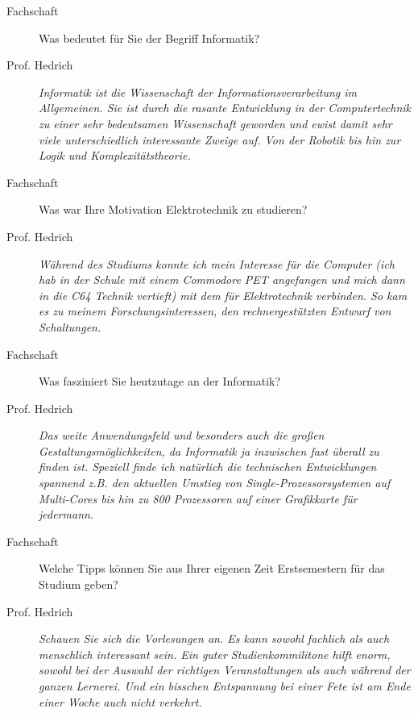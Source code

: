 \begin{description}

\item[Fachschaft] 

Was bedeutet für Sie der Begriff Informatik?

\item[Prof. Hedrich]
 
\textit{Informatik ist die Wissenschaft der Informationsverarbeitung im Allgemeinen.
Sie ist durch die rasante Entwicklung in der Computertechnik zu einer sehr
bedeutsamen Wissenschaft geworden und ewist damit sehr viele unterschiedlich
interessante Zweige auf. Von der Robotik bis hin zur Logik und Komplexitätstheorie.}



\item[Fachschaft]

Was war Ihre Motivation Elektrotechnik zu studieren?

\item[Prof. Hedrich]

\textit{Während des Studiums konnte ich mein Interesse für die Computer (ich hab
in der Schule mit einem Commodore PET angefangen und mich dann in
die C64 Technik vertieft) mit dem für Elektrotechnik verbinden.
So kam es zu meinem Forschungsinteressen, den rechnergestützten Entwurf von
Schaltungen.}

\item[Fachschaft]

Was fasziniert Sie heutzutage an der Informatik?

\item[Prof. Hedrich]

\textit{Das weite Anwendungsfeld und besonders auch die großen
Gestaltungsmöglichkeiten, da Informatik ja inzwischen fast überall
zu finden ist. Speziell finde ich natürlich die technischen Entwicklungen
spannend z.B. den aktuellen Umstieg von Single-Prozessorsystemen auf
Multi-Cores bis hin zu 800 Prozessoren auf einer Grafikkarte für
jedermann.}

\item[Fachschaft]

Welche Tipps können Sie aus Ihrer eigenen Zeit Erstsemestern für das Studium geben?

\item[Prof. Hedrich]

\textit{Schauen Sie sich die Vorlesungen an. Es kann sowohl fachlich als auch
menschlich interessant sein. Ein guter Studienkommilitone hilft enorm,
sowohl bei der Auswahl der richtigen Veranstaltungen als auch während der
ganzen Lernerei. Und ein bisschen Entspannung bei einer Fete ist am Ende einer Woche
auch nicht verkehrt.}

\end{description}




\spaltenende
